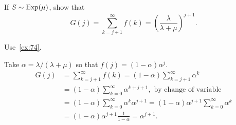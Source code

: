 \begin{exercise}
 If $S\sim \operatorname{Exp}(\mu)$, show that 
 \begin{equation}
G(j) = \sum_{k=j+1}^\infty f(k) = \left(\frac{\lambda}{\lambda+\mu}\right)^{j+1}.
 \end{equation}
\begin{hint}
 Use~\cref{ex:74}.
\end{hint}
\begin{solution}
 Take $\alpha = \lambda/(\lambda+\mu)$ so that
 $f(j) = (1-\alpha) \alpha^j$.
\begin{align*}
 G(j) 
&= \sum_{k=j+1}^\infty f(k) = (1-\alpha) \sum_{k=j+1}^\infty \alpha^k \\
& = (1-\alpha) \sum_{k=0}^\infty \alpha^{k+j+1}, \text{ by change of variable}\\
& = (1-\alpha) \sum_{k=0}^\infty \alpha^{k}\alpha^{j+1}= (1-\alpha)\alpha^{j+1} \sum_{k=0}^\infty \alpha^k \\
&= (1-\alpha)\alpha^{j+1} \frac{1}{1-\alpha} = \alpha^{j+1}.
\end{align*}
\end{solution}
\end{exercise}

